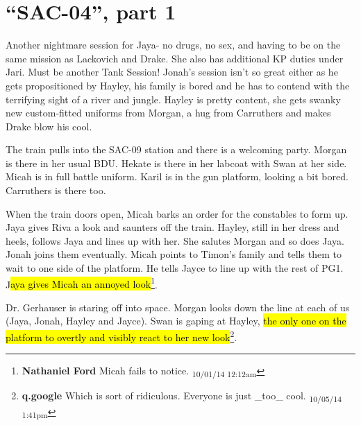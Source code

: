 \setcounter{chapter}{ 32 }
\chapter{\textbf{``SAC-04'', part 1} }





Another nightmare session for Jaya- no drugs, no sex, and having to be on the same mission as Lackovich and Drake.  She also has additional KP duties under Jari.  Must be another Tank Session!   Jonah's session isn't so great either as he gets propositioned by Hayley, his family is bored and he has to contend with the terrifying sight of a river and jungle.  Hayley is pretty content, she gets swanky new custom-fitted uniforms from Morgan, a hug from Carruthers and makes Drake blow his cool.  



\noindent\hrulefill





The train pulls into the SAC-09 station and there is a welcoming party.  Morgan is there in her usual BDU.  Hekate is there in her labcoat with Swan at her side.  Micah is in full battle uniform.  Karil is in the gun platform, looking a bit bored.  Carruthers is there too.



When the train doors open, Micah barks an order for the constables to form up.  Jaya gives Riva a look and saunters off the train. Hayley, still in her dress and heels, follows Jaya and lines up with her.  She salutes Morgan and so does Jaya.  Jonah joins them eventually.  Micah points to Timon's family and tells them to wait to one side of the platform.  He tells Jayce to line up with the rest of PG1.  J\hl{aya gives Micah an annoyed look}\footnote{\textbf{Nathaniel Ford }Micah fails to notice. \textsubscript{10/01/14 12:12am}}.



Dr. Gerhauser is staring off into space.  Morgan looks down the line at each of us (Jaya, Jonah, Hayley and Jayce).  Swan is gaping at Hayley, \hl{the only one on the platform to overtly and visibly react to her new look}\footnote{\textbf{q.google }Which is sort of ridiculous.  Everyone is just \_too\_ cool. \textsubscript{10/05/14 1:41pm}}.  



